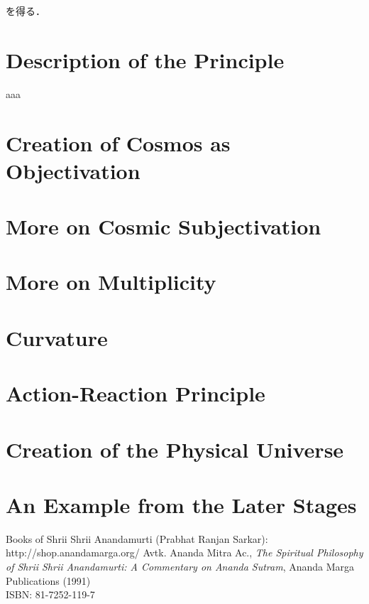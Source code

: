 \documentclass[12pt,a4j,draft]{jarticle}
\numberwithin{equation}{section}
\theoremstyle{break}
\begin{document}
を得る．

\newpage
\section{Description of the Principle}
aaa
%
\newpage
\section{Creation of Cosmos as Objectivation}
%
\newpage
\section{More on Cosmic Subjectivation}
%
\newpage
\section{More on Multiplicity}
%
\newpage
\section{Curvature}
%
\newpage
\section{Action-Reaction Principle}
%
\newpage
\section{Creation of the Physical Universe}
%
\section{An Example from the Later Stages}
%
\newpage
\begin{thebibliography}{99}
Books of Shrii Shrii Anandamurti (Prabhat Ranjan Sarkar): \\
http://shop.anandamarga.org/
Avtk. Ananda Mitra Ac., \emph{The Spiritual Philosophy of Shrii Shrii Anandamurti: A Commentary on Ananda Sutram}, Ananda Marga Publications (1991) \\
ISBN: 81-7252-119-7
\end{thebibliography}
\end{document}
